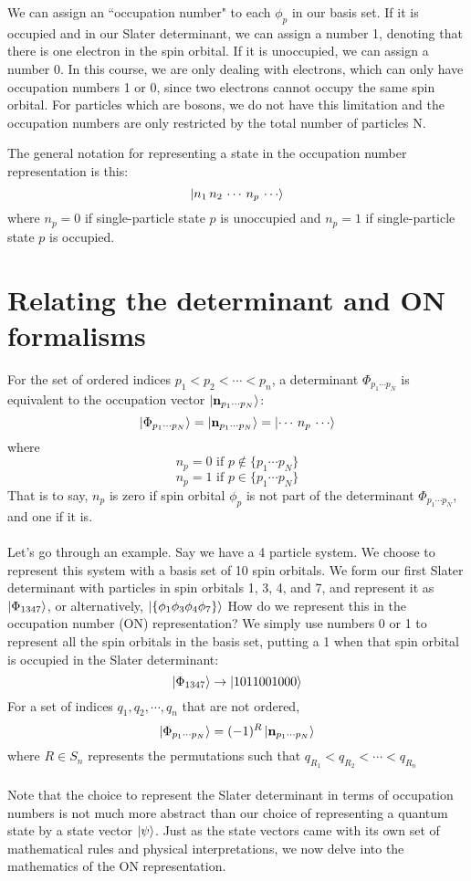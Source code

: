 \documentclass{article}
\begin{document}
We can assign an ``occupation number" to each $\phi_p$ in our basis set.
If it is occupied and in our Slater determinant, we can assign a number 1, denoting that there is one electron in the spin orbital.
If it is unoccupied, we can assign a number 0.
In this course, we are only dealing with electrons, which can only have occupation numbers 1 or 0, since two electrons cannot occupy the same spin orbital. 
For particles which are bosons, we do not have this limitation and the occupation numbers are only restricted by the total number of particles N. 

The general notation for representing a state in the occupation number representation is this: 
\[\ket{n_1 \, n_2 \, \cdots \,  n_p \, \cdots }\] 
where $n_p = 0$ if single-particle state $p$ is unoccupied and $n_p = 1$ if single-particle state $p$ is occupied.

\section{Relating the determinant and ON formalisms}

For the set of ordered indices $p_1 < p_2 < \cdots < p_n$, a determinant $\Phi_{p_1 \cdots p_N}$ is equivalent to the occupation vector $\ket{\mathbf{n}_{p_1 \cdots p_N}}$:
\[\ket{\Phi_{p_1 \cdots p_N}} = \ket{\bold{n}_{p_1 \cdots p_N}}= \ket{ \cdots \,  n_p \, \cdots }\] 
where
\[n_p = 0 \,\, \text{if $p \notin \{p_1 \cdots p_N\}$} \]
\[n_p = 1 \,\, \text{if $p \in \{p_1 \cdots p_N\}$} \]
That is to say, $n_p$ is zero if spin orbital $\phi_p$ is not part of the determinant $\Phi_{p_1 \cdots p_N}$, and one if it is. \\
\\
Let's go through an example. 
Say we have a 4 particle system. 
We choose to represent this system with a basis set of 10 spin orbitals. 
We form our first Slater determinant with particles in spin orbitals 1, 3, 4, and 7, and represent it as 
$\ket{\Phi_{1347}}$, or alternatively, $\ket{\{\phi_1\phi_3\phi_4\phi_7\}}$
How do we represent this in the  occupation number (ON) representation? 
We simply use numbers 0 or 1 to represent all the spin orbitals in the basis set, putting a 1 when that spin orbital is occupied in the Slater determinant: 
\[\ket{\Phi_{1347}} \rightarrow \ket{1011001000} \]
For a set of indices $q_1, q_2, \cdots, q_n$ that are not ordered, 
\[\ket{\Phi_{p_1 \cdots p_N}}  = (-1)^R \ket{\bold{n}_{p_1 \cdots p_N}}\]
where $R \in S_n$ represents the permutations such that $q_{R_1} < q_{R_2} < \cdots < q_{R_n}$ \\
\\
Note that the choice to represent the Slater determinant in terms of occupation numbers is not much more abstract than our choice 
of representing a quantum state by a state vector $\ket{\psi}$.
Just as the state vectors came with its own set of mathematical rules and physical interpretations, 
we now delve into the mathematics of the ON representation. 
\end{document}
